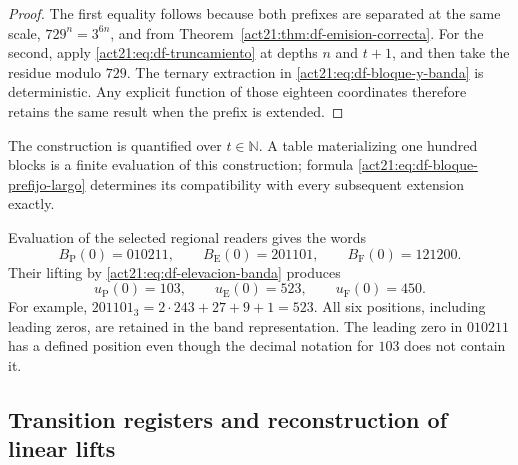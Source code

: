 \begin{proof}
The first equality follows because both prefixes are separated at the same
scale, \(729^n=3^{6n}\), and from
Theorem~\ref{act21:thm:df-emision-correcta}. For the second, apply
\eqref{act21:eq:df-truncamiento} at depths \(n\) and \(t+1\), and then take
the residue modulo \(729\). The ternary extraction in
\eqref{act21:eq:df-bloque-y-banda} is deterministic. Any explicit function of
those eighteen coordinates therefore retains the same result when the
prefix is extended.
\end{proof}

The construction is quantified over \(t\in\mathbb N\). A table
materializing one hundred blocks is a finite evaluation of this
construction; formula \eqref{act21:eq:df-bloque-prefijo-largo} determines its
compatibility with every subsequent extension exactly.

\begin{example}
Evaluation of the selected regional readers gives the words
\[
 B_{\mathrm P}(0)=010211,\qquad
 B_{\mathrm E}(0)=201101,\qquad
 B_{\mathrm F}(0)=121200.
\]
Their lifting by \eqref{act21:eq:df-elevacion-banda} produces
\[
 u_{\mathrm P}(0)=103,\qquad
 u_{\mathrm E}(0)=523,\qquad
 u_{\mathrm F}(0)=450.
\]
For example,
\(201101_3=2\cdot243+27+9+1=523\).
All six positions, including leading zeros, are retained in the band
representation. The leading zero in \(010211\) has a defined position
even though the decimal notation for \(103\) does not contain it.
\end{example}

\subsection{Transition registers and reconstruction of linear lifts}
\label{act21:subsec:df-registros-transicion}


